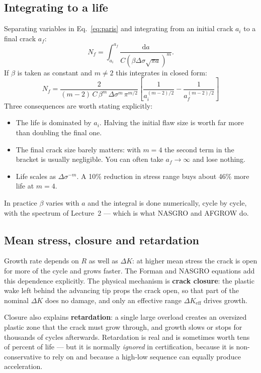 \documentclass[11pt,a4paper]{article}
\begin{document}
\subsection{Integrating to a life}
Separating variables in Eq.~\eqref{eq:paris} and integrating from an initial crack $a_i$ to a final crack $a_f$:
\begin{equation}
  N_f=\int_{a_i}^{a_f}\frac{\mathrm{d}a}{C\left(\beta\Delta\sigma\sqrt{\pi a}\right)^{m}} .
\end{equation}
If $\beta$ is taken as constant and $m\neq2$ this integrates in closed form:
\begin{equation}
  \boxed{\;N_f=\frac{2}{(m-2)\,C\,\beta^{m}\,\Delta\sigma^{m}\,\pi^{m/2}}
  \left[\frac{1}{a_i^{(m-2)/2}}-\frac{1}{a_f^{(m-2)/2}}\right]\;}
  \label{eq:life}
\end{equation}
Three consequences are worth stating explicitly:
\begin{itemize}[nosep]
  \item The life is dominated by $a_i$. Halving the initial flaw size is worth far more than doubling the final one.
  \item The final crack size barely matters: with $m=4$ the second term in the bracket is usually negligible. You can often take $a_f\to\infty$ and lose nothing.
  \item Life scales as $\Delta\sigma^{-m}$. A 10\% reduction in stress range buys about 46\% more life at $m=4$.
\end{itemize}
In practice $\beta$ varies with $a$ and the integral is done numerically, cycle by cycle, with the spectrum of Lecture~2 --- which is what NASGRO and AFGROW do.

\subsection{Mean stress, closure and retardation}
Growth rate depends on $R$ as well as $\Delta K$: at higher mean stress the crack is open for more of the cycle and grows faster. The Forman and NASGRO equations add this dependence explicitly. The physical mechanism is \textbf{crack closure}: the plastic wake left behind the advancing tip props the crack open, so that part of the nominal $\Delta K$ does no damage, and only an effective range $\Delta K_{\text{eff}}$ drives growth.

Closure also explains \textbf{retardation}: a single large overload creates an oversized plastic zone that the crack must grow through, and growth slows or stops for thousands of cycles afterwards. Retardation is real and is sometimes worth tens of percent of life --- but it is normally \emph{ignored} in certification, because it is non-conservative to rely on and because a high-low sequence can equally produce acceleration.
\end{document}
